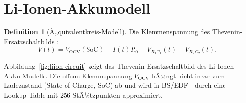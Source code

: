 ﻿\documentclass[a4paper,12pt]{scrreprt}
\theoremstyle{definition}
\newtheorem{definition}{Definition}[chapter]
\begin{document}
	\section{Li-Ionen-Akkumodell}

	\begin{definition}[Ã„quivalentkreis-Modell]
		Die Klemmenspannung des Thevenin-Ersatz\-schaltbilds \cite{Epp2026liionp}:
		\[
		V(t) = V_{\mathrm{OCV}}(\mathrm{SoC}) - I(t) R_0 - V_{R_1 C_1}(t) - V_{R_2 C_2}(t).
		\]
	\end{definition}

	Abbildung~\ref{fig:liion-circuit} zeigt das Thevenin-Ersatzschaltbild
	des Li-Ionen-Akku-Modells. Die offene Klemmspannung $V_{\mathrm{OCV}}$ hÃ¤ngt
	nichtlinear vom Ladezustand (State of Charge, SoC) ab und wird in BS/EDF$^+$
	durch eine Lookup-Table mit 256 StÃ¼tzpunkten approximiert.
\end{document}
